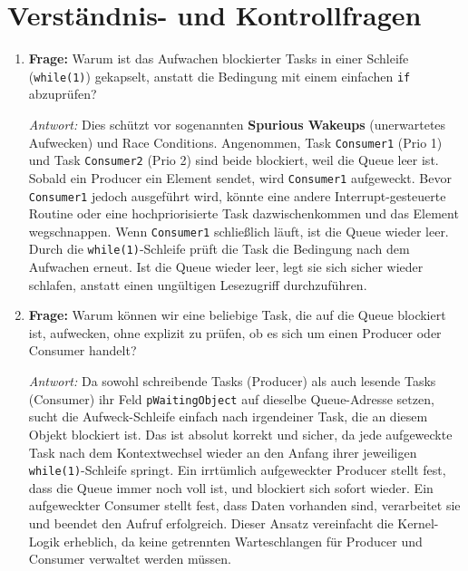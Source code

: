 \section{Verständnis- und Kontrollfragen}
\begin{enumerate}
    \item \textbf{Frage:} Warum ist das Aufwachen blockierter Tasks in einer Schleife (\lstinline|while(1)|) gekapselt, anstatt die Bedingung mit einem einfachen \lstinline|if| abzuprüfen?
    
    \textit{Antwort:} Dies schützt vor sogenannten \textbf{Spurious Wakeups} (unerwartetes Aufwecken) und Race Conditions. Angenommen, Task \lstinline|Consumer1| (Prio 1) und Task \lstinline|Consumer2| (Prio 2) sind beide blockiert, weil die Queue leer ist. Sobald ein Producer ein Element sendet, wird \lstinline|Consumer1| aufgeweckt. Bevor \lstinline|Consumer1| jedoch ausgeführt wird, könnte eine andere Interrupt-gesteuerte Routine oder eine hochpriorisierte Task dazwischenkommen und das Element wegschnappen. Wenn \lstinline|Consumer1| schließlich läuft, ist die Queue wieder leer. Durch die \lstinline|while(1)|-Schleife prüft die Task die Bedingung nach dem Aufwachen erneut. Ist die Queue wieder leer, legt sie sich sicher wieder schlafen, anstatt einen ungültigen Lesezugriff durchzuführen.
    
    \item \textbf{Frage:} Warum können wir eine beliebige Task, die auf die Queue blockiert ist, aufwecken, ohne explizit zu prüfen, ob es sich um einen Producer oder Consumer handelt?
    
    \textit{Antwort:} Da sowohl schreibende Tasks (Producer) als auch lesende Tasks (Consumer) ihr Feld \lstinline|pWaitingObject| auf dieselbe Queue-Adresse setzen, sucht die Aufweck-Schleife einfach nach irgendeiner Task, die an diesem Objekt blockiert ist. Das ist absolut korrekt und sicher, da jede aufgeweckte Task nach dem Kontextwechsel wieder an den Anfang ihrer jeweiligen \lstinline|while(1)|-Schleife springt. Ein irrtümlich aufgeweckter Producer stellt fest, dass die Queue immer noch voll ist, und blockiert sich sofort wieder. Ein aufgeweckter Consumer stellt fest, dass Daten vorhanden sind, verarbeitet sie und beendet den Aufruf erfolgreich. Dieser Ansatz vereinfacht die Kernel-Logik erheblich, da keine getrennten Warteschlangen für Producer und Consumer verwaltet werden müssen.
\end{enumerate}
